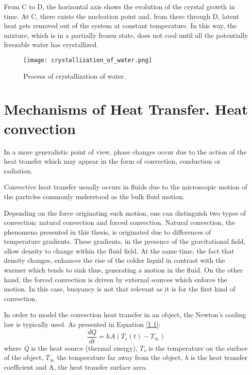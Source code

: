 \noindent From C to D, the horizontal axis shows the evolution of the crystal growth in time. At C, there exists the nucleation point and, from there through D, latent heat gets removed out of the system at constant temperature. In this way, the mixture, which is in a partially frozen state, does not cool until all the potentially freezable water has crystallized.
\clearpage

\begin{figure}[h]
	\centering
	\texttt{[image: crystallization\_of\_water.png]}
	\caption{Process of crystallization of water.}
	\label{1.7fig}	
\end{figure} 


\section{Mechanisms of Heat Transfer. Heat convection}

\setlength{\parindent}{0.5cm} In a more generalistic point of view, phase changes occur due to the action of the heat transfer which may appear in the form of convection, conduction or radiation. 

\noindent Convective heat transfer usually occurs in fluids due to the microscopic motion of the particles commonly understood as the bulk fluid motion.

\noindent Depending on the force originating such motion, one can distinguish two types of convection: natural convection and forced convection. Natural convection, the phenomena presented in this thesis, is originated due to differences of temperature gradients. These gradients, in the presence of the gravitational field, allow density to change within the fluid field. At the same time, the fact that density changes, enhances the rise of the colder liquid in contrast with the warmer which tends to sink thus, generating a motion in the fluid. On the other hand, the forced convection is driven by external sources which enforce the motion. In this case, buoyancy is not that relevant as it is for the first kind of convection. 

\noindent In order to model the convection heat transfer in an object, the Newton's cooling law is typically used. As presented in Equation \ref{1.1}:
\begin{equation}
\frac{d Q}{d t}=h A\left(T_{s}(t)-T_{\infty}\right)
\label{1.1}
\end{equation}
where \textit{Q} is the heat source (thermal energy), $T_s$ is the temperature on the surface of the object, $T_{\infty}$ the temperature far away from the object, \textit{h} is the heat transfer coefficient and A, the heat transfer surface area.

